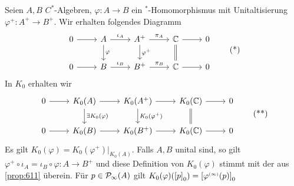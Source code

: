Seien $A,B$ $C^*$-Algebren, $\varphi \colon A \to B$ ein $^*$-Homomorphismus mit Unitaltisierung $\varphi^+ \colon A^+ \to B^+$.
Wir erhalten folgendes Diagramm
\begin{equation}
	\begin{tikzcd}
		0 \rar & A \rar["\iota_A"] \dar["\varphi"] & A^+ \rar["\pi_A"]  \dar["\varphi^+"] & \mathbb{C} \rar \dar[equal] & 0 \\
		0 \rar & B \rar["\iota_B"] & B^+ \rar["\pi_B"] & \mathbb{C} \rar & 0
	\end{tikzcd} \label{eq:73:1} \tag{*}
\end{equation}
In $K_0$ erhalten wir
\begin{equation}
	\begin{tikzcd}
		0 \rar & K_0(A) \dar["\exists K_0(\varphi)"] \rar & K_0(A^+) \dar["K_0(\varphi^+)"] \rar & K_0(\mathbb{C}) \rar \dar[equal] & 0 \\
		0 \rar & K_0(B) \rar & K_0(B^+) \rar & K_0(\mathbb{C}) \rar & 0
	\end{tikzcd} \label{eq:73:2} \tag{**}
\end{equation}
Es gilt $K_0(\varphi) = K_0(\varphi^+)|_{K_0(A)}$.
Falls $A,B$ unital sind, so gilt $\varphi^+ \circ \iota_A = \iota_B \circ \varphi \colon A \to B^+$ und diese Definition von $K_0(\varphi)$ stimmt mit der aus \autoref{prop:611} überein.
Für $p \in \mathcal{P}\mkern-2mu_{\infty}(A)$ gilt $K_0(\varphi) \enbrace*{\benbrace*{p}_0} = \benbrace*{\varphi^\ssbrace{\infty}(p)}_0$


